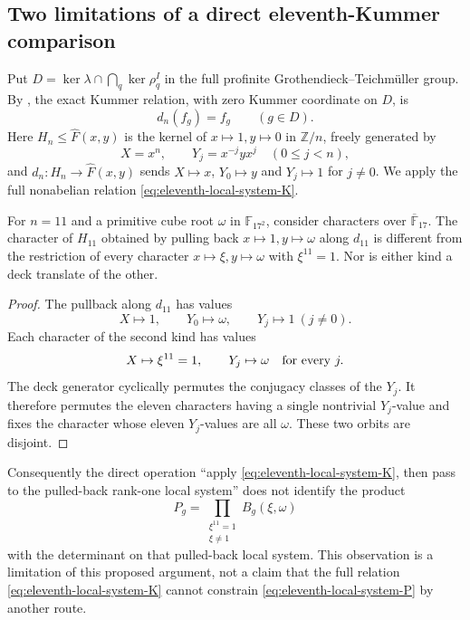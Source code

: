 \subsection{Two limitations of a direct eleventh-Kummer comparison}

Put $D=\ker\lambda\cap\bigcap_q\ker\rho_q^I$ in the full
profinite Grothendieck--Teichm\"uller group.  By \cite[Theorem~8.1 and Remark~8.6]{Enriquez2007}, the exact
Kummer relation, with zero Kummer coordinate on $D$, is
\begin{equation}\label{eq:eleventh-local-system-K}
d_n(f_g)=f_g\qquad(g\in D).
\end{equation}
Here $H_n\leq\widehat F(x,y)$ is the kernel of $x\mapsto1,y\mapsto0$
in $\mathbb Z/n$, freely generated by
\[
 X=x^n,\qquad Y_j=x^{-j}yx^j\quad(0\leq j<n),
\]
and $d_n:H_n\to\widehat F(x,y)$ sends $X\mapsto x$, $Y_0\mapsto y$
and $Y_j\mapsto1$ for $j\ne0$.  We apply the full nonabelian relation \eqref{eq:eleventh-local-system-K}.

\begin{lemma}\label{lem:kn-different-local-systems}
For $n=11$ and a primitive cube root $\omega$ in
$\mathbb F_{17^2}$, consider characters over $\overline{\mathbb F}_{17}$.
The character of $H_{11}$ obtained by pulling
back $x\mapsto1,y\mapsto\omega$ along $d_{11}$ is different from
the restriction of every character
$x\mapsto\xi,y\mapsto\omega$ with $\xi^{11}=1$.
Nor is either kind a deck translate of the other.
\end{lemma}
\begin{proof}
The pullback along $d_{11}$ has values
\[
 X\mapsto1,\qquad Y_0\mapsto\omega,\qquad
 Y_j\mapsto1\ (j\ne0).
\]
Each character of the second kind has values
\[
 X\mapsto\xi^{11}=1,\qquad Y_j\mapsto\omega
 \quad\hbox{for every }j.
\]
The deck generator cyclically permutes the conjugacy classes of
the $Y_j$.  It therefore permutes the eleven characters having a
single nontrivial $Y_j$-value and fixes the character whose eleven
$Y_j$-values are all $\omega$.  These two orbits are disjoint.
\end{proof}

Consequently the direct operation ``apply \eqref{eq:eleventh-local-system-K}, then pass to the
pulled-back rank-one local system'' does not identify the product
\begin{equation}\label{eq:eleventh-local-system-P}
P_g=\prod_{\substack{\xi^{11}=1\\\xi\ne1}}B_g(\xi,\omega)
\end{equation}
with the determinant on that pulled-back local system.  This
observation is a limitation of this proposed argument, not a claim
that the full relation \eqref{eq:eleventh-local-system-K} cannot constrain \eqref{eq:eleventh-local-system-P} by another route.

